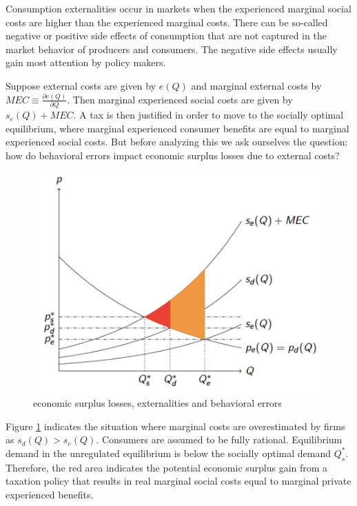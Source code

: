 \documentclass[
]{book}
\begin{document}
Consumption externalities occur in markets when the experienced marginal social costs are higher than the experienced marginal costs. There can be so-called negative or positive side effects of consumption that are not captured in the market behavior of producers and consumers. The negative side effects usually gain most attention by policy makers.

Suppose external costs are given by \(e(Q)\) and marginal external costs by \(MEC \equiv \frac{\partial e(Q)}{\partial Q}\). Then marginal experienced social costs are given by \(s_e (Q)+MEC\). A tax is then justified in order to move to the socially optimal equilibrium, where marginal experienced consumer benefits are equal to marginal experienced social costs. But before analyzing this we ask ourselves the question: how do behavioral errors impact economic surplus losses due to external costs?

\begin{figure}
\includegraphics[width=12.92in]{./figures/econsurplusexterrors} \caption{economic surplus losses, externalities and behavioral errors}\label{fig:econsurplusexterrors}
\end{figure}

Figure \ref{fig:econsurplusexterrors} indicates the situation where marginal costs are overestimated by firms as \(s_d (Q)>s_e (Q)\). Consumers are assumed to be fully rational. Equilibrium demand in the unregulated equilibrium is below the socially optimal demand \(Q_s^*\). Therefore, the red area indicates the potential economic surplus gain from a taxation policy that results in real marginal social costs equal to marginal private experienced benefits.
\end{document}
